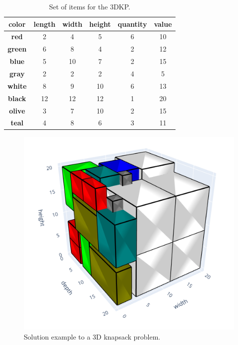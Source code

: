 \begin{table}[h]
    \centering
    \caption{Set of items for the 3DKP.}
    \label{tab:3DKP example items}
    \begin{tabular}{cccccc}
        \toprule
        \textbf{color} & \textbf{length} & \textbf{width} & \textbf{height} & \textbf{quantity} & \textbf{value}\\
        \midrule
        \textbf{red} & 2 & 4 & 5 & 6 & 10\\
        \textbf{green} & 6 & 8 & 4 & 2 & 12\\
        \textbf{blue} & 5 & 10 & 7 & 2 & 15\\
        \textbf{gray} & 2 & 2 & 2 & 4 & 5\\
        \textbf{white} & 8 & 9 & 10 & 6 & 13\\
        \textbf{black} & 12 & 12 & 12 & 1 & 20\\
        \textbf{olive} & 3 & 7 & 10 & 2 & 15\\
        \textbf{teal} & 4 & 8 & 6 & 3 & 11\\
        \bottomrule
    \end{tabular}
\end{table}

\begin{figure}[h]
    \centering
    \includegraphics[scale=0.55]{images/Egeblad3Dexample.png}
    \caption{Solution example to a 3D knapsack problem.}
    \label{fig:3DKP Egeblad solution example}
\end{figure}

